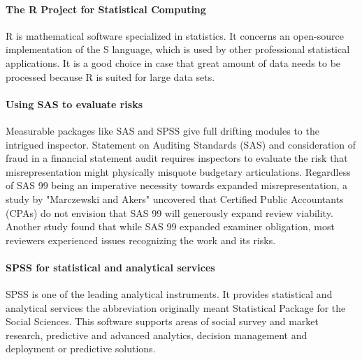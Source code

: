 {%

\paragraph{The R Project for Statistical Computing} 
R is mathematical software specialized in statistics. It concerns an open-source implementation of the S language, which is used by other professional statistical applications. It is a good choice in case that great amount of data needs to be processed because R is suited for large data sets.


\paragraph{Using SAS to evaluate risks }

Measurable packages like SAS and SPSS give full drifting modules to the intrigued inspector. Statement on Auditing Standards (SAS) and consideration of fraud in a financial statement audit requires inspectors to evaluate the risk that misrepresentation might physically misquote budgetary articulations. Regardless of SAS 99 being an imperative necessity towards expanded misrepresentation, a study by "Marczewski and Akers"\cite{21} uncovered that Certified Public Accountants (CPAs) do not envision that SAS 99 will generously expand review viability. Another study found that while SAS 99 expanded examiner obligation, most reviewers experienced issues recognizing the work and its risks.



\paragraph{SPSS for statistical and analytical services}

SPSS is one of the leading analytical instruments. It provides statistical and analytical services the abbreviation originally meant Statistical Package for the Social Sciences. This software supports areas of social survey and market research, predictive and advanced analytics, decision management and deployment or predictive solutions.


}
